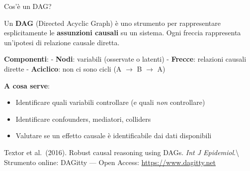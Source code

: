 \documentclass[
  ignorenonframetext,
]{beamer}
\begin{document}
\begin{frame}{Cos'è un DAG?}
\label{cosuxe8-un-dag}
\small

Un \textbf{DAG} (Directed Acyclic Graph) è uno strumento per
rappresentare esplicitamente le \textbf{assunzioni causali} su un
sistema. Ogni freccia rappresenta un'ipotesi di relazione causale
diretta.

\vspace{0.3em}

\textbf{Componenti}: \footnotesize - \textbf{Nodi}: variabili (osservate
o latenti) - \textbf{Frecce}: relazioni causali dirette -
\textbf{Aciclico}: non ci sono cicli (A \(\to\) B \(\to\) A)

\vspace{0.3em}

\textbf{A cosa serve}:

\begin{itemize}\footnotesize
\item Identificare quali variabili controllare (e quali \emph{non} controllare)
\item Identificare confounders, mediatori, colliders
\item Valutare se un effetto causale è identificabile dai dati disponibili
\end{itemize}

\vspace{0.2em}

\tiny Textor et al.~(2016). Robust causal reasoning using DAGs.
\emph{Int J Epidemiol}.\textbackslash{} Strumento online: DAGitty ---
Open Access: \url{https://www.dagitty.net}
\end{frame}
\end{document}

